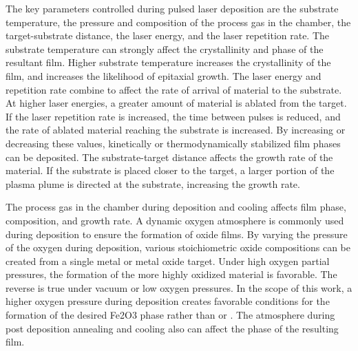 \documentclass[12pt,%
              twoside,
               letterpaper]{uiothesis}
\begin{document}
The key parameters controlled during pulsed laser deposition are the substrate
temperature, the pressure and composition of the process gas in the chamber, the
target-substrate distance, the laser energy, and the laser repetition rate. The substrate
temperature can strongly affect the crystallinity and phase of the resultant film. Higher
substrate temperature increases the crystallinity of the film, and increases the
likelihood of epitaxial growth.\cite{Francis:2004cf} The laser energy and repetition rate
combine to affect the rate of arrival of material to the substrate. At higher laser
energies, a greater amount of material is ablated from the target. If the laser repetition
rate is increased, the time between pulses is reduced, and the rate of ablated material
reaching the substrate is increased. By increasing or decreasing these values, kinetically
or thermodynamically stabilized film phases can be deposited. The substrate-target
distance affects the growth rate of the material. If the substrate is placed closer to the
target, a larger portion of the plasma plume is directed at the substrate, increasing the
growth rate. 

The process gas in the chamber during deposition and cooling affects film phase,
composition, and growth rate. A dynamic oxygen atmosphere is commonly used during
deposition to ensure the formation of oxide films. By varying the pressure of the oxygen
during deposition, various stoichiometric oxide compositions can be created from a single
metal or metal oxide target. Under high oxygen partial pressures, the formation of the
more highly oxidized material is favorable. The reverse is true under vacuum or low oxygen
pressures. In the scope of this work, a higher oxygen pressure during deposition creates
favorable conditions for the formation of the desired Fe2O3 phase rather than
 or . The atmosphere during post deposition annealing and cooling also
can affect the phase of the resulting film.
\end{document}
